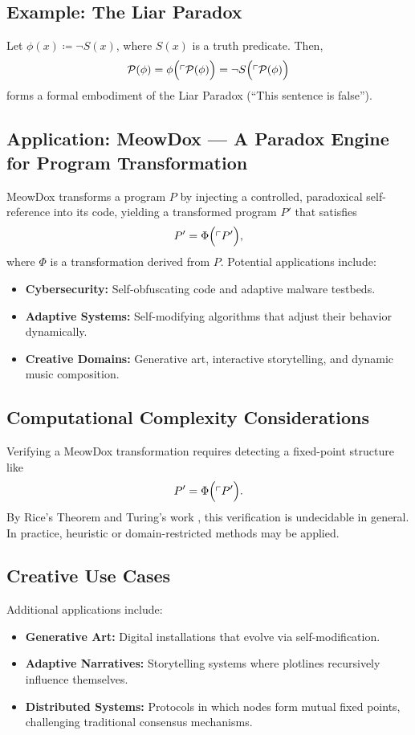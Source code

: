 \documentclass[12pt]{amsart}
\theoremstyle{plain}
\theoremstyle{definition}
\theoremstyle{remark}
\begin{document}
\subsection{Example: The Liar Paradox}
Let $\phi(x) \coloneqq \neg S(x)$, where $S(x)$ is a truth predicate. Then,
\[
\mathcal{P}(\phi) = \phi\Bigl(\ulcorner \mathcal{P}(\phi) \Bigr) = \neg S\Bigl(\ulcorner \mathcal{P}(\phi) \Bigr)
\]
forms a formal embodiment of the Liar Paradox (``This sentence is false'').

\subsection{Application: MeowDox --- A Paradox Engine for Program Transformation}
MeowDox transforms a program $P$ by injecting a controlled, paradoxical self-reference into its code, yielding a transformed program $P'$ that satisfies
\[
P' = \Phi\Bigl(\ulcorner P' \Bigr),
\]
where $\Phi$ is a transformation derived from $P$. Potential applications include:
\begin{itemize}
    \item \textbf{Cybersecurity:} Self-obfuscating code and adaptive malware testbeds.
    \item \textbf{Adaptive Systems:} Self-modifying algorithms that adjust their behavior dynamically.
    \item \textbf{Creative Domains:} Generative art, interactive storytelling, and dynamic music composition.
\end{itemize}

\subsection{Computational Complexity Considerations}
Verifying a MeowDox transformation requires detecting a fixed-point structure like
\[
P' = \Phi\Bigl(\ulcorner P' \Bigr).
\]
By Rice’s Theorem and Turing’s work \cite{Turing1936,Rice1953}, this verification is undecidable in general. In practice, heuristic or domain-restricted methods may be applied.

\subsection{Creative Use Cases}
Additional applications include:
\begin{itemize}
    \item \textbf{Generative Art:} Digital installations that evolve via self-modification.
    \item \textbf{Adaptive Narratives:} Storytelling systems where plotlines recursively influence themselves.
    \item \textbf{Distributed Systems:} Protocols in which nodes form mutual fixed points, challenging traditional consensus mechanisms.
\end{itemize}
\end{document}
